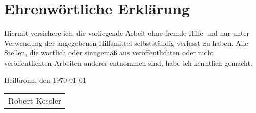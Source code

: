 \onehalfspace
\section*{Ehrenwörtliche Erklärung}

Hiermit versichere ich, die vorliegende Arbeit ohne fremde Hilfe und nur unter Verwendung der angegebenen Hilfsmittel selbstständig verfasst zu haben. 
Alle Stellen, die wörtlich oder sinngemäß aus veröffentlichten oder nicht veröffentlichten Arbeiten anderer entnommen sind, habe ich kenntlich gemacht.\bigskip

\noindent
Heilbronn, den \today

\vspace*{2cm}


\begin{tabular}{@{}l@{}}\hline
\rule{0pt}{2ex}
Robert Kessler
\end{tabular}


